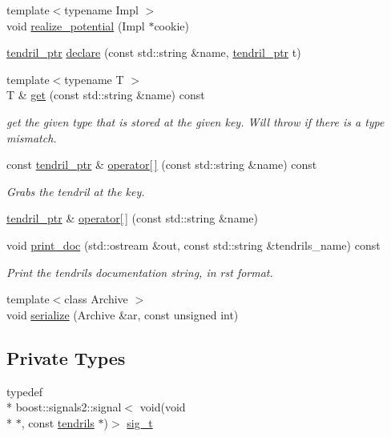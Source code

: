 \begin{DoxyCompactItemize}
\item 
{\footnotesize template$<$typename Impl $>$ }\\void \hyperlink{classecto_1_1tendrils_a1072755c7df91725bcabb7dc65db103b}{realize\-\_\-potential} (Impl $\ast$cookie)
\item 
\hyperlink{namespaceecto_a84fb5f6130275382e5cbeb5fdececa78}{tendril\-\_\-ptr} \hyperlink{classecto_1_1tendrils_aa32bcd230653775b655b63a415a349eb}{declare} (const std\-::string \&name, \hyperlink{namespaceecto_a84fb5f6130275382e5cbeb5fdececa78}{tendril\-\_\-ptr} t)
\item 
{\footnotesize template$<$typename T $>$ }\\T \& \hyperlink{classecto_1_1tendrils_a43aea6bf46edc5921a9768838b9fbe93}{get} (const std\-::string \&name) const 
\begin{DoxyCompactList}\small\item\em get the given type that is stored at the given key. Will throw if there is a type mismatch. \end{DoxyCompactList}\item 
const \hyperlink{namespaceecto_a84fb5f6130275382e5cbeb5fdececa78}{tendril\-\_\-ptr} \& \hyperlink{classecto_1_1tendrils_a2462fa379fff3d0f81afa8eb40d45624}{operator\mbox{[}$\,$\mbox{]}} (const std\-::string \&name) const 
\begin{DoxyCompactList}\small\item\em Grabs the tendril at the key. \end{DoxyCompactList}\item 
\hyperlink{namespaceecto_a84fb5f6130275382e5cbeb5fdececa78}{tendril\-\_\-ptr} \& \hyperlink{classecto_1_1tendrils_a774ab854c749359953b44ffdaa62456c}{operator\mbox{[}$\,$\mbox{]}} (const std\-::string \&name)
\item 
void \hyperlink{classecto_1_1tendrils_a3e29152c1c0979cf02219d0e02b8fb5e}{print\-\_\-doc} (std\-::ostream \&out, const std\-::string \&tendrils\-\_\-name) const 
\begin{DoxyCompactList}\small\item\em Print the tendrils documentation string, in rst format. \end{DoxyCompactList}\item 
{\footnotesize template$<$class Archive $>$ }\\void \hyperlink{classecto_1_1tendrils_aa9839d00f20cf2a3b87c0cbf19864a4f}{serialize} (Archive \&ar, const unsigned int)
\end{DoxyCompactItemize}
\subsection*{Private Types}
\begin{DoxyCompactItemize}
\item 
typedef \\*
boost\-::signals2\-::signal$<$ void(void \\*
$\ast$, const \hyperlink{classecto_1_1tendrils}{tendrils} $\ast$)$>$ \hyperlink{classecto_1_1tendrils_aca7990b4d8ccfbddfb4d5c805345ca23}{sig\-\_\-t}
\end{DoxyCompactItemize}
